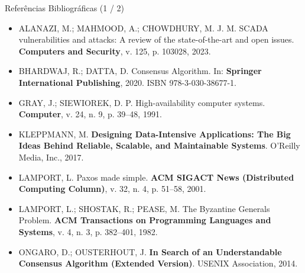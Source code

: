 \documentclass[aspectratio=169,10pt]{beamer}
\begin{document}
\begin{frame}{Referências Bibliográficas (1 / 2)}
  \scriptsize
  \begin{itemize}
    \item ALANAZI, M.; MAHMOOD, A.; CHOWDHURY, M. J. M. SCADA vulnerabilities and attacks: A review of the state-of-the-art and open issues. \textbf{Computers and Security}, v. 125, p. 103028, 2023.
    \item BHARDWAJ, R.; DATTA, D. Consensus Algorithm. In: \textbf{Springer International Publishing}, 2020. ISBN 978-3-030-38677-1.
    \item GRAY, J.; SIEWIOREK, D. P. High-availability computer systems. \textbf{Computer}, v. 24, n. 9, p. 39--48, 1991.
    \item KLEPPMANN, M. \textbf{Designing Data-Intensive Applications: The Big Ideas Behind Reliable, Scalable, and Maintainable Systems}. O'Reilly Media, Inc., 2017.
    \item LAMPORT, L. Paxos made simple. \textbf{ACM SIGACT News (Distributed Computing Column)}, v. 32, n. 4, p. 51--58, 2001.
    \item LAMPORT, L.; SHOSTAK, R.; PEASE, M. The Byzantine Generals Problem. \textbf{ACM Transactions on Programming Languages and Systems}, v. 4, n. 3, p. 382--401, 1982.
    \item ONGARO, D.; OUSTERHOUT, J. \textbf{In Search of an Understandable Consensus Algorithm (Extended Version)}. USENIX Association, 2014.
  \end{itemize}
\end{frame}
\end{document}
